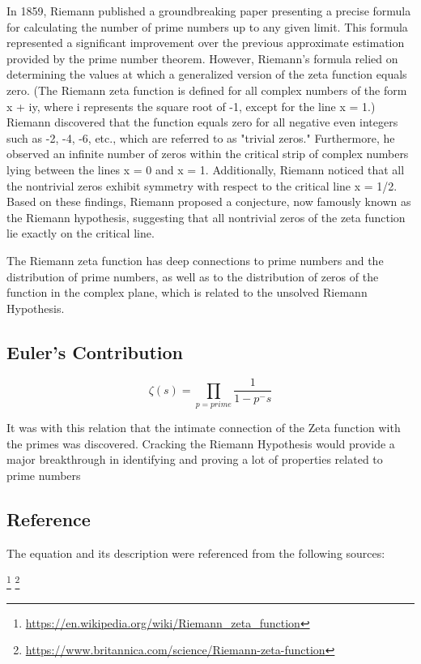 \documentclass{article}
\begin{document}
In 1859, Riemann published a groundbreaking paper presenting a precise formula for calculating the number of prime numbers up to any 
given limit. This formula represented a significant improvement over the previous approximate estimation provided by the prime number 
theorem. However, Riemann's formula relied on determining the values at which a generalized version of the zeta function equals zero. 
(The Riemann zeta function is defined for all complex numbers of the form x + iy, where i represents the square root of -1, except 
for the line x = 1.) Riemann discovered that the function equals zero for all negative even integers such as -2, -4, -6, etc., which 
are referred to as "trivial zeros." Furthermore, he observed an infinite number of zeros within the critical strip of complex numbers 
lying between the lines x = 0 and x = 1. Additionally, Riemann noticed that all the nontrivial zeros exhibit symmetry with respect to 
the critical line x = 1/2. Based on these findings, Riemann proposed a conjecture, now famously known as the Riemann hypothesis, 
suggesting that all nontrivial zeros of the zeta function lie exactly on the critical line. 

The Riemann zeta function has deep connections to prime numbers and the distribution of prime numbers, as well as to the distribution 
of zeros of the function in the complex plane, which is related to the unsolved Riemann Hypothesis.

\subsection{Euler's Contribution}
\begin{equation}
    \zeta(s) =\prod_{p=prime} \frac{1}{1-p^-s}
\end{equation}

It was with this relation that the intimate connection of the Zeta function with the primes was discovered. Cracking the Riemann 
Hypothesis would provide a major breakthrough in identifying and proving a lot of properties related to prime numbers

\subsection{Reference}

The equation and its description were referenced from the following sources:

\footnote{\url{https://en.wikipedia.org/wiki/Riemann_zeta_function}}
\footnote{\url{https://www.britannica.com/science/Riemann-zeta-function}}
\end{document}
